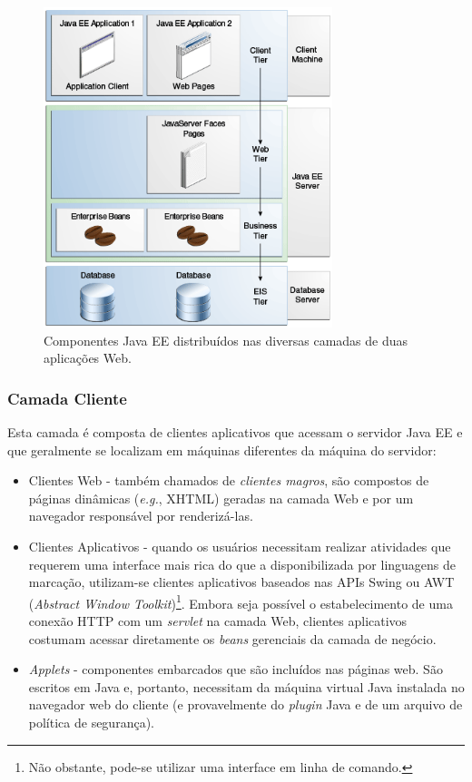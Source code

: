 \documentclass[
  10.5pt,				  %
	openright,			%
	twoside,			  %
  a5paper,
  chapter=TITLE,	%
	section=TITLE,	%
  hyphens,        %
	english,        %
	brazil          %
]{abntex2}
\begin{document}
\begin{figure}[!ht]
  \caption{\label{fig:multitiered_app}Componentes Java EE distribuídos nas diversas camadas de duas aplicações Web.}
  \begin{center}
    \includegraphics[width=0.75\textwidth]{multitiered_applications.png}
  \end{center}
\end{figure}

\subsubsection{Camada Cliente}

Esta camada é composta de clientes aplicativos que acessam o servidor Java EE e que geralmente se localizam em máquinas diferentes da máquina do servidor:

\begin{itemize}
  \item Clientes Web - também chamados de \emph{clientes magros}, são compostos de páginas dinâmicas (\emph{e.g.}, XHTML) geradas na camada Web e por um navegador responsável por renderizá-las.
  \item Clientes Aplicativos - quando os usuários necessitam realizar atividades que requerem uma interface mais rica do que a disponibilizada por linguagens de marcação, utilizam-se clientes aplicativos baseados nas APIs Swing ou AWT (\emph{Abstract Window Toolkit})\footnote{Não obstante, pode-se utilizar uma interface em linha de comando.}. Embora seja possível o estabelecimento de uma conexão HTTP com um \emph{servlet} na camada Web, clientes aplicativos costumam acessar diretamente os \emph{beans} gerenciais da camada de negócio.
  \item \emph{Applets} - componentes embarcados que são incluídos nas páginas web. São escritos em Java e, portanto, necessitam da máquina virtual Java instalada no navegador web do cliente (e provavelmente do \emph{plugin} Java e de um arquivo de política de segurança).
\end{itemize}
\end{document}
